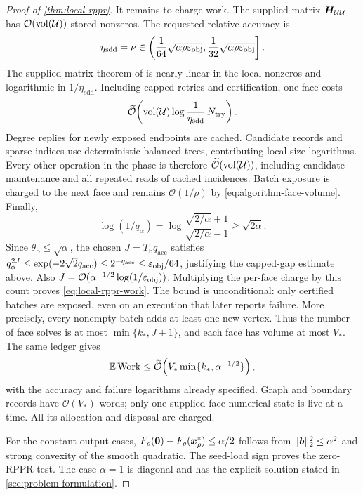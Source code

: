 \begin{proof}[Proof of \cref{thm:local-rppr}]
It remains to charge work. The supplied matrix $\bm{H}_{\mathcal{U}\mathcal{U}}$ has
$\mathcal{O}(\operatorname{vol}(\mathcal{U}))$ stored nonzeros.  The requested relative
accuracy is
\begin{equation*}
 \eta_{\mathrm{sdd}}=\nu
 \in\left(\frac1{64}\sqrt{\alpha\rho\varepsilon_{\mathrm{obj}}},
          \frac1{32}\sqrt{\alpha\rho\varepsilon_{\mathrm{obj}}}\right].
\end{equation*}
The supplied-matrix theorem of \citet{koutis2011nearly} is nearly linear in
the local nonzeros and logarithmic in $1/\eta_{\mathrm{sdd}}$.  Including capped
retries and certification, one face costs
\[
 \widetilde{\mathcal{O}}\!\left(
   \operatorname{vol}(\mathcal{U})\log\frac1{\eta_{\mathrm{sdd}}}\,N_{\mathrm{try}}
 \right).
\]
Degree replies for newly exposed endpoints are cached. Candidate records
and sparse indices use deterministic balanced trees, contributing local-size
logarithms. Every other operation in the phase is therefore
$\widetilde{\mathcal{O}}(\operatorname{vol}(\mathcal{U}))$, including candidate maintenance and all repeated
reads of cached incidences.  Batch exposure is
charged to the next face and remains $\mathcal{O}(1/\rho)$ by
\cref{eq:algorithm-face-volume}.  Finally,
\begin{equation*}
 \log(1/q_\alpha)
 =\log\frac{\sqrt{2/\alpha}+1}{\sqrt{2/\alpha}-1}
 \geq\sqrt{2\alpha}.
\end{equation*}
Since $\theta_{\mathrm{b}}\leq\sqrt\alpha$, the chosen
$J=T_{\mathrm{b}}q_{\mathrm{acc}}$ satisfies
$q_\alpha^{2J}\leq\exp(-2\sqrt2q_{\mathrm{acc}})
 \leq2^{-q_{\mathrm{acc}}}\leq\varepsilon_{\mathrm{obj}}/64$,
justifying the capped-gap estimate above.
Also $J=\mathcal{O}(\alpha^{-1/2}\log(1/\varepsilon_{\mathrm{obj}}))$.
Multiplying the per-face charge by this count proves
\cref{eq:local-rppr-work}.  The bound is unconditional:
only certified batches are exposed, even on an execution that later reports
failure. More precisely, every nonempty batch adds at least one new vertex.
Thus the number of face solves is at most
$\min\{k_*,J+1\}$, and each face has volume at most $V_*$.
The same ledger gives
\begin{equation}
 \mathbb{E}\operatorname{Work}\leq
 \widetilde{\mathcal{O}}\!\left(V_*\min\{k_*,\alpha^{-1/2}\}\right),
 \label{eq:randomized-refined-ledger}
\end{equation}
with the accuracy and failure logarithms already specified. Graph and
boundary records have $\mathcal{O}(V_*)$ words; only one supplied-face numerical
state is live at a time. All its allocation and disposal are charged.

For the constant-output cases, $F_\rho(\bm{0})-F_\rho(\bm{x}_\rho^*)\leq
\alpha/2$ follows from $\lVert\bm{b}\rVert_2^2\leq\alpha^2$ and strong convexity of
the smooth quadratic.  The seed-load sign proves the zero-RPPR test. The case $\alpha=1$ is diagonal and has the explicit solution stated in \cref{sec:problem-formulation}.
\end{proof}

